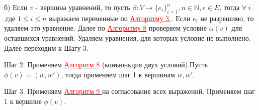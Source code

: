\documentclass[12pt]{article}
\begin{document}
     б) Если $v$ - вершина уравнений, то пусть $\beta : V \rightarrow \lbrace  e_{i}  \rbrace_{i=1}^{n}, n \in \mathbb{N}, e \in E$, тогда $\forall \: i$,где $ 1 \leq i \leq n$ выражаем переменные по \hyperlink{a3}{ \textcolor{red}{Алгоритму 3 }}. Если $e_{i} $ не разрешимо, то удаляем это уравнение. Далее по \hyperlink{a8}{ \textcolor{red}{Алгоритму 8}} проверяем условие $\alpha(v)$ для оставшихся уравнений. Удаляем уравнения, для которых условие не выполнено. Далее переходим к Шагу 3.
          
     Шаг 2. Применяем  \hyperlink{a8}{ \textcolor{red}{Алгоритм 8}} (конъюнкция двух условий).Пусть $\phi(v)=(w,w')$, тогда применяем шаг 1 к вершинам $w, w'$.
     
     Шаг 3. Применяем  \hyperlink{a9}{ \textcolor{red}{Алгоритм 9 }} на согласование  всех выражений. Применяем шаг 1 к вершине $\phi(v)$.
     
     
     
     
     
     
     
\end{document}

